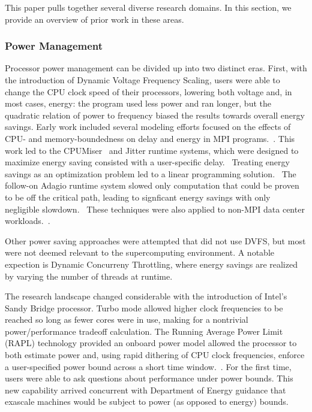 This paper pulls together several diverse research domains.  In this section,
we provide an overview of prior work in these areas.

\subsubsection{Power Management}
Processor power management can be divided up into two distinct eras.  First, with 
the introduction of Dynamic Voltage Frequency Scaling, users were able to 
change the CPU clock speed of their processors, lowering both voltage and,
in most cases, energy:  the program used less power and ran longer, but the
quadratic relation of power to frequency biased the results towards overall
energy savings.  Early work included several modeling efforts focused on
the effects of CPU- and memory-boundedness on delay and energy in MPI programs.~\cite{SpringerPPoPP2006,GeICPP2007,LiHPCA2006,CameronSC2005,HsuSC2005}. 
This work led to the CPUMiser~\cite{GeICPP2007} and Jitter runtime systems, which were designed 
to maximize energy saving consisted with a user-specific delay.~\cite{KappiahSC2005}
Treating energy savings as an optimization problem led to a linear programming
solution.~\cite{rountree:07} The follow-on Adagio runtime system slowed only
computation that could be proven to be off the critical path, leading to signficant
energy savings with only negligible slowdown.~\cite{rountree:09} These 
techniques were also applied to non-MPI data center workloads.~\cite{femal:04}. 

Other power saving approaches were attempted that did not use DVFS, but most
were not deemed relevant to the supercomputing environment.  A notable expection
is Dynamic Concurreny Throttling, where energy savings are realized by varying
the number of threads at runtime.~\cite{Curtis1,Curtis2,Curtis3} 

The research landscape changed considerable with the introduction of Intel's
Sandy Bridge processor.  Turbo mode allowed higher clock frequencies to be
reached so long as fewer cores were in use, making for a nontrivial power/performance tradeoff
calculation.  The Running Average Power Limit (RAPL) technology provided an onboard power model allowed the processor to both
estimate power and, using rapid dithering of CPU clock frequencies, enforce a
user-specified power bound across a short time window.~\cite{IntelSDM,David2010}. 
For the first time, users were able to ask questions about performance under 
power bounds.  This new capability arrived concurrent with Department of Energy
guidance that exascale machines would be subject to power (as opposed to energy) bounds.

